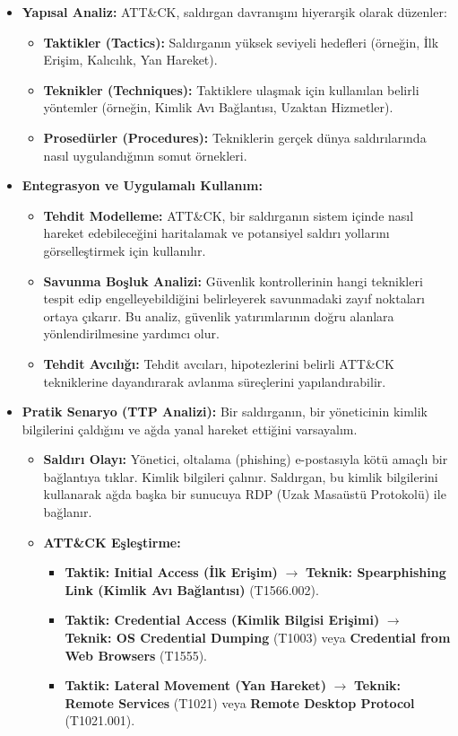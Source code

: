 \begin{itemize}
    \item \textbf{Yapısal Analiz:} ATT\&CK, saldırgan davranışını hiyerarşik olarak düzenler:
    \begin{itemize}
        \item \textbf{Taktikler (Tactics):} Saldırganın yüksek seviyeli hedefleri (örneğin, İlk Erişim, Kalıcılık, Yan Hareket).
        \item \textbf{Teknikler (Techniques):} Taktiklere ulaşmak için kullanılan belirli yöntemler (örneğin, Kimlik Avı Bağlantısı, Uzaktan Hizmetler).
        \item \textbf{Prosedürler (Procedures):} Tekniklerin gerçek dünya saldırılarında nasıl uygulandığının somut örnekleri.
    \end{itemize}
    \item \textbf{Entegrasyon ve Uygulamalı Kullanım:}
    \begin{itemize}
        \item \textbf{Tehdit Modelleme:} ATT\&CK, bir saldırganın sistem içinde nasıl hareket edebileceğini haritalamak ve potansiyel saldırı yollarını görselleştirmek için kullanılır.
        \item \textbf{Savunma Boşluk Analizi:} Güvenlik kontrollerinin hangi teknikleri tespit edip engelleyebildiğini belirleyerek savunmadaki zayıf noktaları ortaya çıkarır. Bu analiz, güvenlik yatırımlarının doğru alanlara yönlendirilmesine yardımcı olur.
        \item \textbf{Tehdit Avcılığı:} Tehdit avcıları, hipotezlerini belirli ATT\&CK tekniklerine dayandırarak avlanma süreçlerini yapılandırabilir.
    \end{itemize}
    \item \textbf{Pratik Senaryo (TTP Analizi):} Bir saldırganın, bir yöneticinin kimlik bilgilerini çaldığını ve ağda yanal hareket ettiğini varsayalım.
    \begin{itemize}
        \item \textbf{Saldırı Olayı:} Yönetici, oltalama (phishing) e-postasıyla kötü amaçlı bir bağlantıya tıklar. Kimlik bilgileri çalınır. Saldırgan, bu kimlik bilgilerini kullanarak ağda başka bir sunucuya RDP (Uzak Masaüstü Protokolü) ile bağlanır.
        \item \textbf{ATT\&CK Eşleştirme:}
        \begin{itemize}
            \item \textbf{Taktik: Initial Access (İlk Erişim)} $\rightarrow$ \textbf{Teknik: Spearphishing Link (Kimlik Avı Bağlantısı)} (T1566.002).
            \item \textbf{Taktik: Credential Access (Kimlik Bilgisi Erişimi)} $\rightarrow$ \textbf{Teknik: OS Credential Dumping} (T1003) veya \textbf{Credential from Web Browsers} (T1555).
            \item \textbf{Taktik: Lateral Movement (Yan Hareket)} $\rightarrow$ \textbf{Teknik: Remote Services} (T1021) veya \textbf{Remote Desktop Protocol} (T1021.001).
        \end{itemize}
    \end{itemize}
\end{itemize}

